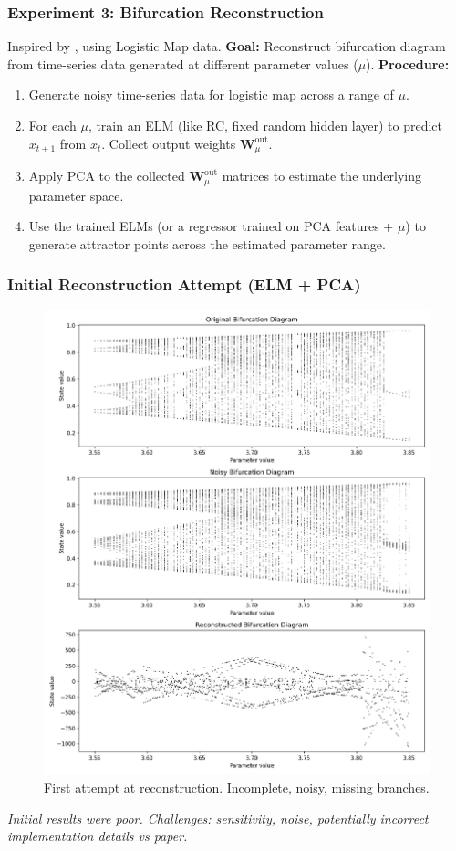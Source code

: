 \documentclass{beamer}
\begin{document}
\begin{frame}
    \frametitle{Experiment 3: Bifurcation Reconstruction}
    Inspired by \cite{Itoh2020}, using Logistic Map data.
    \textbf{Goal:} Reconstruct bifurcation diagram from time-series data generated at different parameter values ($\mu$).
    \pause
    \textbf{Procedure:}
    \begin{enumerate}
        \item Generate noisy time-series data for logistic map across a range of $\mu$.
        \item For each $\mu$, train an ELM (like RC, fixed random hidden layer) to predict $x_{t+1}$ from $x_t$. Collect output weights $\mathbf{W}^{\mathrm{out}}_{\mu}$.
        \item Apply PCA to the collected $\mathbf{W}^{\mathrm{out}}_{\mu}$ matrices to estimate the underlying parameter space.
        \item Use the trained ELMs (or a regressor trained on PCA features + $\mu$) to generate attractor points across the estimated parameter range.
    \end{enumerate}
\end{frame}

\begin{frame}
    \frametitle{Initial Reconstruction Attempt (ELM + PCA)}
    \begin{figure}
        \centering
        \includegraphics[width=0.9\linewidth]{figures/bd_reconstruction_elm.png}
        \caption{First attempt at reconstruction. Incomplete, noisy, missing branches.}
        \label{fig:bifurcation_slide}
    \end{figure}
    \textit{Initial results were poor. Challenges: sensitivity, noise, potentially incorrect implementation details vs paper.}
\end{frame}
\end{document}
